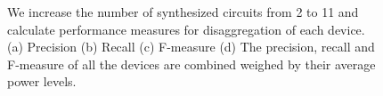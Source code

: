 \begin{figure}[!hbtp]
	\caption{
	We increase the number of synthesized circuits from 2 to 11 and
calculate performance measures for disaggregation of each device.
(a) Precision (b) Recall (c) F-measure (d) The precision, recall and F-measure
of all the devices are combined weighed by their average power levels.
}
	\label{fig_synresults}
\end{figure}


